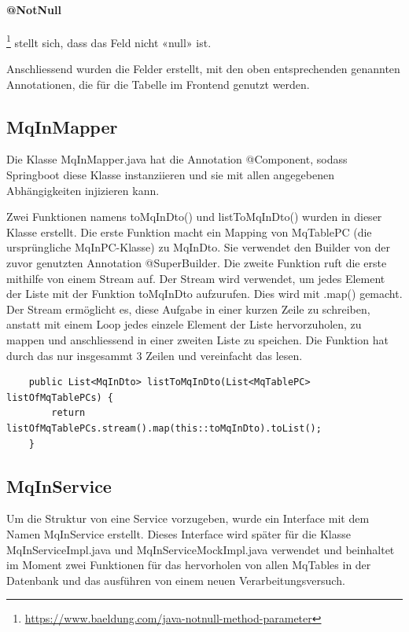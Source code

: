 \paragraph{@NotNull} \footnote{\url{https://www.baeldung.com/java-notnull-method-parameter}} stellt sich, dass das Feld nicht «null» ist.\newline

\noindent Anschliessend wurden die Felder erstellt, mit den oben entsprechenden genannten Annotationen, die für die Tabelle im Frontend genutzt werden.

\subsection{MqInMapper}
Die Klasse MqInMapper.java hat die Annotation @Component, sodass Springboot diese Klasse instanziieren und sie mit allen angegebenen Abhängigkeiten injizieren kann.

Zwei Funktionen namens toMqInDto() und listToMqInDto() wurden in dieser Klasse erstellt. Die erste Funktion macht ein Mapping von MqTablePC (die ursprüngliche MqInPC-Klasse) zu MqInDto. Sie verwendet den Builder von der zuvor genutzten Annotation @SuperBuilder. Die zweite Funktion ruft die erste mithilfe von einem Stream auf. Der Stream wird verwendet, um jedes Element der Liste mit der Funktion toMqInDto aufzurufen. Dies wird mit .map() gemacht. Der Stream ermöglicht es, diese Aufgabe in einer kurzen Zeile zu schreiben, anstatt mit einem Loop jedes einzele Element der Liste hervorzuholen, zu mappen und anschliessend in einer zweiten Liste zu speichen. Die Funktion hat durch das nur insgesammt 3 Zeilen und vereinfacht das lesen.

\begin{verbatim}
	public List<MqInDto> listToMqInDto(List<MqTablePC> listOfMqTablePCs) {
		return listOfMqTablePCs.stream().map(this::toMqInDto).toList();
	}
\end{verbatim}

\subsection{MqInService}
Um die Struktur von eine Service vorzugeben, wurde ein Interface mit dem Namen MqInService erstellt. Dieses Interface wird später für die Klasse MqInServiceImpl.java und MqInServiceMockImpl.java verwendet und beinhaltet im Moment zwei Funktionen für das hervorholen von allen MqTables in der Datenbank und das ausführen von einem neuen Verarbeitungsversuch.

